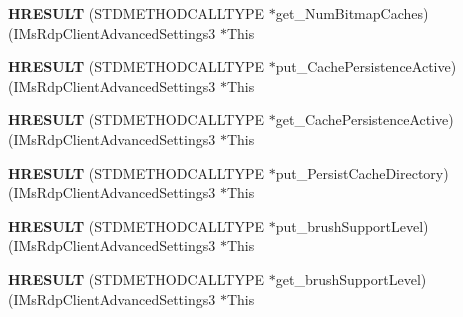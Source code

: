 \begin{DoxyCompactItemize}
\item 
\mbox{\label{struct_i_ms_rdp_client_advanced_settings3_vtbl_a27dc8b5d223b035928d2c15c8097495b}} 
{\bfseries H\+R\+E\+S\+U\+LT} (S\+T\+D\+M\+E\+T\+H\+O\+D\+C\+A\+L\+L\+T\+Y\+PE $\ast$get\+\_\+\+Num\+Bitmap\+Caches)(I\+Ms\+Rdp\+Client\+Advanced\+Settings3 $\ast$This
\item 
\mbox{\label{struct_i_ms_rdp_client_advanced_settings3_vtbl_aff6d5f14cf61c926004d4a1a72ca54e9}} 
{\bfseries H\+R\+E\+S\+U\+LT} (S\+T\+D\+M\+E\+T\+H\+O\+D\+C\+A\+L\+L\+T\+Y\+PE $\ast$put\+\_\+\+Cache\+Persistence\+Active)(I\+Ms\+Rdp\+Client\+Advanced\+Settings3 $\ast$This
\item 
\mbox{\label{struct_i_ms_rdp_client_advanced_settings3_vtbl_add8091c9b4099c8bd11e9ab1c0b59e82}} 
{\bfseries H\+R\+E\+S\+U\+LT} (S\+T\+D\+M\+E\+T\+H\+O\+D\+C\+A\+L\+L\+T\+Y\+PE $\ast$get\+\_\+\+Cache\+Persistence\+Active)(I\+Ms\+Rdp\+Client\+Advanced\+Settings3 $\ast$This
\item 
\mbox{\label{struct_i_ms_rdp_client_advanced_settings3_vtbl_accda8f89f7b08ba39bbcfca8cd7672f6}} 
{\bfseries H\+R\+E\+S\+U\+LT} (S\+T\+D\+M\+E\+T\+H\+O\+D\+C\+A\+L\+L\+T\+Y\+PE $\ast$put\+\_\+\+Persist\+Cache\+Directory)(I\+Ms\+Rdp\+Client\+Advanced\+Settings3 $\ast$This
\item 
\mbox{\label{struct_i_ms_rdp_client_advanced_settings3_vtbl_a6bb770ec6c3a49f2c85aa67b150f9f35}} 
{\bfseries H\+R\+E\+S\+U\+LT} (S\+T\+D\+M\+E\+T\+H\+O\+D\+C\+A\+L\+L\+T\+Y\+PE $\ast$put\+\_\+brush\+Support\+Level)(I\+Ms\+Rdp\+Client\+Advanced\+Settings3 $\ast$This
\item 
\mbox{\label{struct_i_ms_rdp_client_advanced_settings3_vtbl_ad681af9d900324b021c562d68188a08c}} 
{\bfseries H\+R\+E\+S\+U\+LT} (S\+T\+D\+M\+E\+T\+H\+O\+D\+C\+A\+L\+L\+T\+Y\+PE $\ast$get\+\_\+brush\+Support\+Level)(I\+Ms\+Rdp\+Client\+Advanced\+Settings3 $\ast$This
\item 
\mbox{\label{struct_i_ms_rdp_client_advanced_settings3_vtbl_a4a9e673e072aa6bd70a353c116038104}} 

\end{DoxyCompactItemize}
